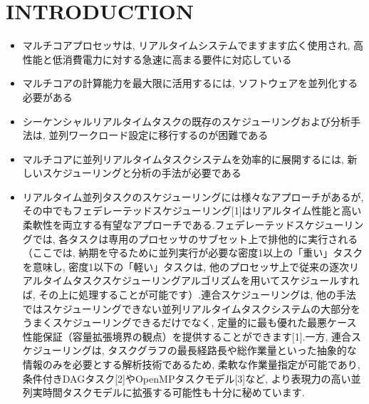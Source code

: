 
\section{INTRODUCTION}
\label{sec: introduction}

\begin{frame}{}
    \begin{itemize}
        \item マルチコアプロセッサは, リアルタイムシステムでますます広く使用され, 高性能と低消費電力に対する急速に高まる要件に対応している
\item マルチコアの計算能力を最大限に活用するには, ソフトウェアを並列化する必要がある
\item シーケンシャルリアルタイムタスクの既存のスケジューリングおよび分析手法は, 並列ワークロード設定に移行するのが困難である
\item マルチコアに並列リアルタイムタスクシステムを効率的に展開するには, 新しいスケジューリングと分析の手法が必要である
    \end{itemize}
\end{frame}

\begin{frame}{}
    \begin{itemize}
        \item リアルタイム並列タスクのスケジューリングには様々なアプローチがあるが, その中でもフェデレーテッドスケジューリング[1]はリアルタイム性能と高い柔軟性を両立する有望なアプローチである.フェデレーテッドスケジューリングでは, 各タスクは専用のプロセッサのサブセット上で排他的に実行される（ここでは, 納期を守るために並列実行が必要な密度1以上の「重い」タスクを意味し, 密度1以下の「軽い」タスクは, 他のプロセッサ上で従来の逐次リアルタイムタスクスケジューリングアルゴリズムを用いてスケジュールすれば, その上に処理することが可能です）.連合スケジューリングは, 他の手法ではスケジューリングできない並列リアルタイムタスクシステムの大部分をうまくスケジューリングできるだけでなく, 定量的に最も優れた最悪ケース性能保証（容量拡張境界の観点）を提供することができます[1].一方, 連合スケジューリングは, タスクグラフの最長経路長や総作業量といった抽象的な情報のみを必要とする解析技術であるため, 柔軟な作業量指定が可能であり, 条件付きDAGタスク[2]やOpenMPタスクモデル[3]など, より表現力の高い並列実時間タスクモデルに拡張する可能性も十分に秘めています.
    \end{itemize}
\end{frame}

